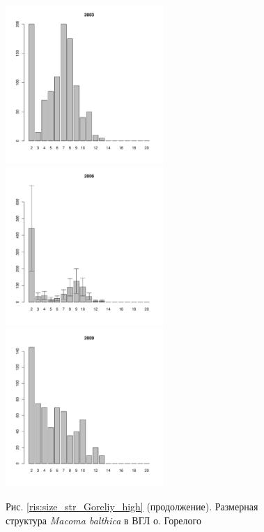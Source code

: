 \documentclass[12pt, a4paper]{article}
\begin{document}
\begin{figure}[h]
\begin{multicols}{3}
\hfill
\includegraphics[width=60mm]{../White_Sea/Luvenga_Goreliy/high2_2003_.pdf}
\hfill
\includegraphics[width=60mm]{../White_Sea/Luvenga_Goreliy/high2_2006_.pdf}
\hfill
\includegraphics[width=60mm]{../White_Sea/Luvenga_Goreliy/high2_2009_.pdf}
\end{multicols}



\begin{center}
Рис. \ref{ris:size_str_Goreliy_high} (продолжение). Размерная структура {\it Macoma balthica} в ВГЛ о. Горелого

\end{center}
\end{figure}
\end{document}
